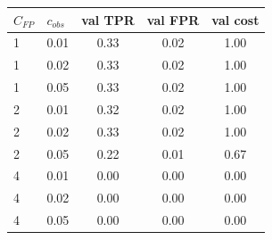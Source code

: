 \begin{tabular}{llccc}
\toprule
$C_{FP}$ & $c_{obs}$ & val TPR & val FPR & val cost \\
\midrule
1 & 0.01 & 0.33 & 0.02 & 1.00 \\
1 & 0.02 & 0.33 & 0.02 & 1.00 \\
1 & 0.05 & 0.33 & 0.02 & 1.00 \\
2 & 0.01 & 0.32 & 0.02 & 1.00 \\
2 & 0.02 & 0.33 & 0.02 & 1.00 \\
2 & 0.05 & 0.22 & 0.01 & 0.67 \\
4 & 0.01 & 0.00 & 0.00 & 0.00 \\
4 & 0.02 & 0.00 & 0.00 & 0.00 \\
4 & 0.05 & 0.00 & 0.00 & 0.00 \\
\bottomrule
\end{tabular}